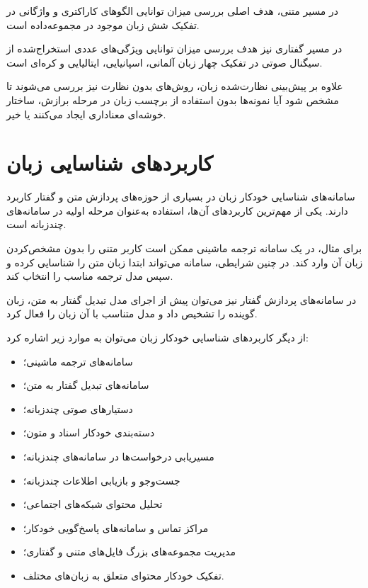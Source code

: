 \documentclass[12pt,a4paper,oneside]{report}
\begin{document}
در مسیر متنی، هدف اصلی بررسی میزان توانایی الگوهای کاراکتری و واژگانی در تفکیک شش زبان موجود در مجموعه‌داده است.

در مسیر گفتاری نیز هدف بررسی میزان توانایی ویژگی‌های عددی استخراج‌شده از سیگنال صوتی در تفکیک چهار زبان آلمانی، اسپانیایی، ایتالیایی و کره‌ای است.

علاوه بر پیش‌بینی نظارت‌شده زبان، روش‌های بدون نظارت نیز بررسی می‌شوند تا مشخص شود آیا نمونه‌ها بدون استفاده از برچسب زبان در مرحله برازش، ساختار خوشه‌ای معناداری ایجاد می‌کنند یا خیر.


\section{کاربردهای شناسایی زبان}

سامانه‌های شناسایی خودکار زبان در بسیاری از حوزه‌های پردازش متن و گفتار کاربرد دارند. یکی از مهم‌ترین کاربردهای آن‌ها، استفاده به‌عنوان مرحله اولیه در سامانه‌های چندزبانه است.

برای مثال، در یک سامانه ترجمه ماشینی ممکن است کاربر متنی را بدون مشخص‌کردن زبان آن وارد کند. در چنین شرایطی، سامانه می‌تواند ابتدا زبان متن را شناسایی کرده و سپس مدل ترجمه مناسب را انتخاب کند.

در سامانه‌های پردازش گفتار نیز می‌توان پیش از اجرای مدل تبدیل گفتار به متن، زبان گوینده را تشخیص داد و مدل متناسب با آن زبان را فعال کرد.

از دیگر کاربردهای شناسایی خودکار زبان می‌توان به موارد زیر اشاره کرد:

\begin{itemize}

	\item سامانه‌های ترجمه ماشینی؛

	\item سامانه‌های تبدیل گفتار به متن؛

	\item دستیارهای صوتی چندزبانه؛

	\item دسته‌بندی خودکار اسناد و متون؛

	\item مسیریابی درخواست‌ها در سامانه‌های چندزبانه؛

	\item جست‌وجو و بازیابی اطلاعات چندزبانه؛

	\item تحلیل محتوای شبکه‌های اجتماعی؛

	\item مراکز تماس و سامانه‌های پاسخ‌گویی خودکار؛

	\item مدیریت مجموعه‌های بزرگ فایل‌های متنی و گفتاری؛

	\item تفکیک خودکار محتوای متعلق به زبان‌های مختلف.

\end{itemize}
\end{document}
